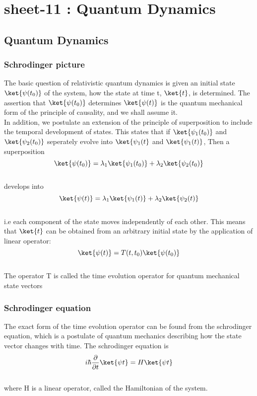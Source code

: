 \chapter{sheet-11 : Quantum Dynamics}
\section{Quantum Dynamics}
\subsection{Schrodinger picture}
The basic question of relativistic quantum dynamics is given an initial state $\ket{\psi(t_0)} $ of the system, how the state at time t, $\ket{t} $, is determined. The assertion that $ \ket{\psi(t_0)}$ determines $\ket{\psi(t)}$ is the quantum mechanical form of the principle of causality, and we shall assume it.\\
In addition, we postulate an extension of the principle of superposition to include the temporal development of states. This states that if $\ket{\psi_1(t_0)}$  and $\ket{\psi_2(t_0)}$ seperately evolve into $\ket{\psi_1(t}$ and $\ket{\psi_1(t)}$, Then a superposition
\[ \ket{\psi(t_0)} = \lambda_1 \ket{\psi_1(t_0)} + \lambda_2 \ket{\psi_2(t_0)}\] \\
develops into \\
\[ \ket{\psi(t)} = \lambda_1 \ket{\psi_1(t)} + \lambda_2 \ket{\psi_2(t)}\]\\
i.e each component of the state moves independently of each other. This means that $\ket{t}$ can be obtained from an arbitrary initial state by the application of linear operator:\\
\[\ket{\psi (t)}= T(t, t_0) \ket{\psi (t_0)}\] \\
The operator T is called the time evolution operator for quantum mechanical state vectors

\subsection{Schrodinger equation}

The exact form of the time evolution operator can be found from the schrodinger equation, which is a postulate of quantum mechanics describing how the state vector changes with time. The schrodinger equation is \\
\[i \hbar \frac{\partial}{\partial t} \ket{\psi t} = H \ket{\psi t} \]\\

where H is a linear operator, called the Hamiltonian of the system.
